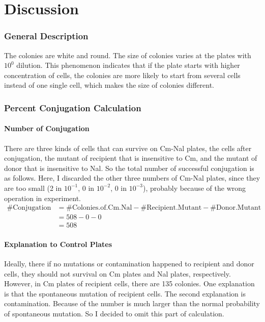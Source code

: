 \documentclass{ctexart}
\begin{document}
	\section{Discussion}
			\subsubsection{General Description} 
			The colonies are white and round. The size of colonies varies at the plates with $10 ^ 0$ dilution. This phenomenon indicates that if the plate starts with higher concentration of cells, the colonies are more likely to start from several cells instead of one single cell, which makes the size of colonies different.

			\subsubsection{Percent Conjugation Calculation} 
			\paragraph{Number of Conjugation} There are three kinds of cells that can survive on Cm-Nal plates, the cells after conjugation, the mutant of recipient that is insensitive to Cm, and the mutant of donor that is insensitive to Nal. So the total number of successful conjugation is as follows. Here, I discarded the other three numbers of Cm-Nal plates, since they are too small (2 in $10 ^ {-1}$, 0 in $10^{-2}$, 0 in $10 ^ {-3}$), probably because of the wrong operation in experiment.
			$$
			\begin{aligned}
			\#\text{Conjugation} &= \#\text{Colonies.of.Cm.Nal} - \#\text{Recipient.Mutant} - \#\text{Donor.Mutant}\\
			&= 508 - 0 - 0\\
			&= 508
			\end{aligned}
			$$

			\paragraph{Explanation to Control Plates} Ideally, there if no mutations or contamination happened to recipient and donor cells, they should not survival on Cm plates and Nal plates, respectively. However, in Cm plates of recipient cells, there are 135 colonies. One explanation is that the spontaneous mutation of recipient cells. The second explanation is contamination. Because of the number is much larger than the normal probability of spontaneous mutation. So I decided to omit this part of calculation.
\end{document}
